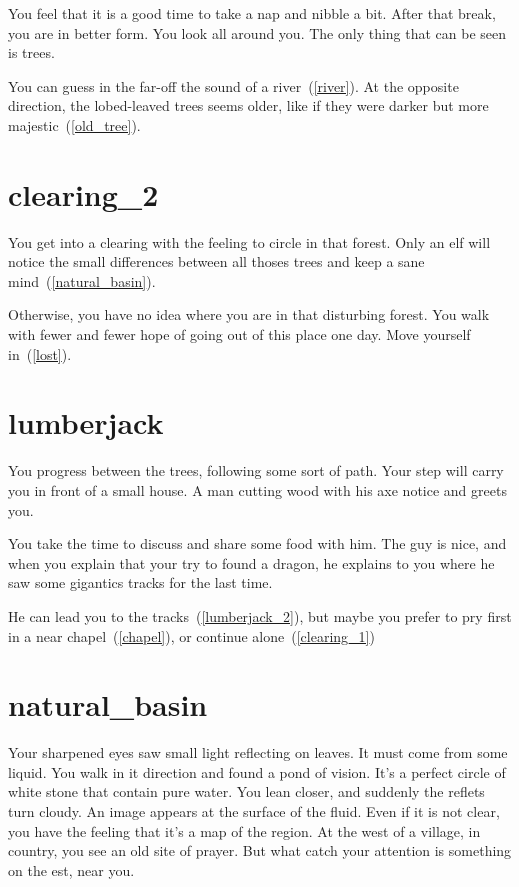 You feel that it is a good time to take a nap and nibble a bit. After that
break, you are in better form. You look all around you. The only thing that can
be seen is trees.

You can guess in the far-off the sound of a river~(\ref{river}). At the opposite
direction, the lobed-leaved trees seems older, like if they were darker but more
majestic~(\ref{old_tree}).

\section{clearing_2}

You get into a clearing with the feeling to circle in that forest. Only an elf
will notice the small differences between all thoses trees and keep a sane
mind~(\ref{natural_basin}).

Otherwise, you have no idea where you are in that disturbing forest. You walk
with fewer and fewer hope of going out of this place one day. Move yourself
in~(\ref{lost}).

\section{lumberjack}

You progress between the trees, following some sort of path. Your step will
carry you in front of a small house. A man cutting wood with his axe notice and
greets you.

You take the time to discuss and share some food with him. The guy is
nice, and when you explain that your try to found a dragon, he explains to you
where he saw some gigantics tracks for the last time.

He can lead you to the tracks~(\ref{lumberjack_2}), but maybe you prefer to pry
first in a near chapel~(\ref{chapel}), or continue alone~(\ref{clearing_1})

\section{natural_basin}

Your sharpened eyes saw small light reflecting on leaves. It must come from some
liquid. You walk in it direction and found a pond of vision. It's a perfect
circle of white stone that contain pure water. You lean closer, and suddenly the
reflets turn cloudy. An image appears at the surface of the fluid. Even if it
is not clear, you have the feeling that it's a map of the region. At the west of
a village, in country, you see an old site of prayer. But what catch your
attention is something on the est, near you.

